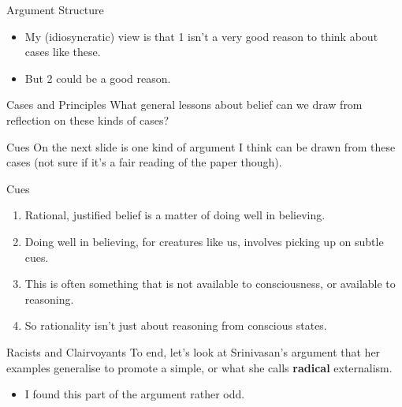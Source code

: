 \documentclass[
  17pt,
  letterpaper,
  ignorenonframetext,
  aspectratio=169,
  handout]{beamer}
\providecommand{\tightlist}{%
  \setlength{\itemsep}{0pt}\setlength{\parskip}{0pt}}\usepackage{longtable,booktabs,array}
\begin{document}
\begin{frame}{Argument Structure}
\protect\hypertarget{argument-structure-1}{}
\begin{itemize}[<+->]
\tightlist
\item
  My (idiosyncratic) view is that 1 isn't a very good reason to think
  about cases like these.
\item
  But 2 could be a good reason.
\end{itemize}
\end{frame}

\begin{frame}{Cases and Principles}
\protect\hypertarget{cases-and-principles}{}
What general lessons about belief can we draw from reflection on these
kinds of cases?
\end{frame}

\begin{frame}{Cues}
\protect\hypertarget{cues}{}
On the next slide is one kind of argument I think can be drawn from
these cases (not sure if it's a fair reading of the paper though).
\end{frame}

\begin{frame}{Cues}
\protect\hypertarget{cues-1}{}
\begin{enumerate}[<+->]
\tightlist
\item
  Rational, justified belief is a matter of doing well in believing.
\item
  Doing well in believing, for creatures like us, involves picking up on
  subtle cues.
\item
  This is often something that is not available to consciousness, or
  available to reasoning.
\item
  So rationality isn't just about reasoning from conscious states.
\end{enumerate}
\end{frame}

\begin{frame}{Racists and Clairvoyants}
\protect\hypertarget{racists-and-clairvoyants}{}
To end, let's look at Srinivasan's argument that her examples generalise
to promote a simple, or what she calls \textbf{radical} externalism.

\begin{itemize}[<+->]
\tightlist
\item
  I found this part of the argument rather odd.
\end{itemize}
\end{frame}
\end{document}
